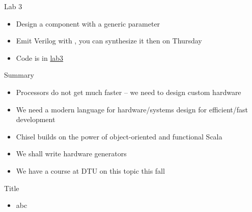\begin{frame}[fragile]{Lab 3}
\begin{itemize}
\item Design a component with a generic parameter
\item Emit Verilog with , you can synthesize it then on Thursday
\item Code is in \href{https://github.com/schoeberl/agile-hw/tree/main/lab3}{lab3}
\end{itemize}
\end{frame}

\begin{frame}[fragile]{Summary}
\begin{itemize}
\item Processors do not get much faster -- we need to design custom hardware
\item We need a modern language for hardware/systems design for efficient/fast development
\item Chisel builds on the power of object-oriented and functional Scala
\item We shall write hardware generators
\item We have a course at DTU on this topic this fall
\end{itemize}
\end{frame}




\begin{frame}[fragile]{Title}
\begin{itemize}
\item abc
\end{itemize}
\end{frame}
